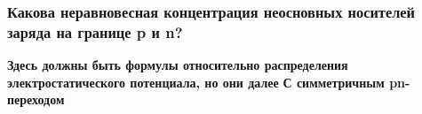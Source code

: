 \subsubsection{Какова неравновесная концентрация неосновных носителей заряда на границе p и n?}
\textbf{Здесь должны быть формулы относительно распределения электростатического потенциала, но они далее}
\textbf{С симметричным pn-переходом}\\



\pagebreak
